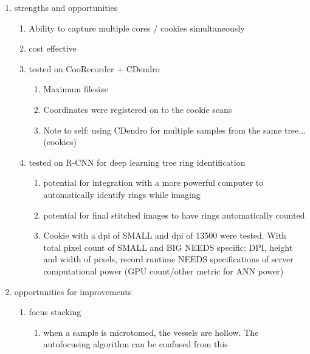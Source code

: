 \documentclass{article}
\begin{document}
\begin{outline}[enumerate]
\begin{enumerate}
		\begin{enumerate}
			\item 
		\end{enumerate}
	\item strengths and opportunities
		\begin{enumerate} %
		\item Ability to capture multiple cores / cookies simultaneously
		\item cost effective
		\item tested on CooRecorder + CDendro
			\begin{enumerate}
			\item Maximum filesize 
			\item Coordinates were registered on to the cookie scans 
			\item Note to self: using CDendro for multiple samples from the same tree... (cookies) 
			\end{enumerate}
		\item tested on R-CNN for deep learning tree ring identification
			\begin{enumerate}
			\item potential for integration with a more powerful computer to automatically identify rings while imaging
			\item potential for final stitched images to have rings automatically counted
			\item Cookie with a dpi of SMALL and dpi of 13500 were tested. With total pixel count of SMALL and BIG
				\subitem NEEDS specific: DPI, height and width of pixels, record runtime
				\subitem NEEDS specifications of server computational power (GPU count/other metric for ANN power)
			\end{enumerate}
		\end{enumerate}
	\item opportunities for improvements
		\begin{enumerate}
		\item focus stacking
			\begin {enumerate}
			\item when a sample is microtomed, the vessels are hollow. The autofocusing algorithm can be confused from this 
			\end{enumerate}

\end{enumerate}
\end{enumerate}
\end{outline}
\end{document}
